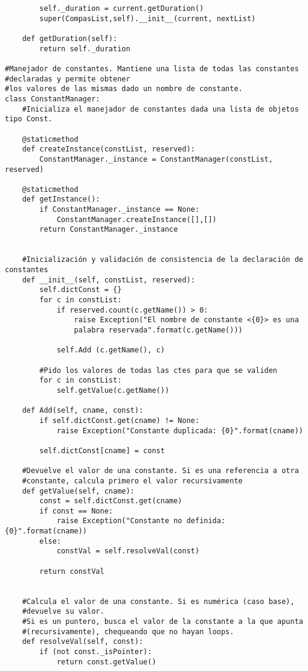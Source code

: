\begin{verbatim}
        self._duration = current.getDuration()
        super(CompasList,self).__init__(current, nextList)

    def getDuration(self):
        return self._duration

#Manejador de constantes. Mantiene una lista de todas las constantes 
#declaradas y permite obtener
#los valores de las mismas dado un nombre de constante.
class ConstantManager:
    #Inicializa el manejador de constantes dada una lista de objetos tipo Const.

    @staticmethod
    def createInstance(constList, reserved):
        ConstantManager._instance = ConstantManager(constList, reserved)

    @staticmethod
    def getInstance():
        if ConstantManager._instance == None:
            ConstantManager.createInstance([],[])
        return ConstantManager._instance


    #Inicialización y validación de consistencia de la declaración de constantes
    def __init__(self, constList, reserved):
        self.dictConst = {}
        for c in constList:
            if reserved.count(c.getName()) > 0:
                raise Exception("El nombre de constante <{0}> es una 
                palabra reservada".format(c.getName()))

            self.Add (c.getName(), c)

        #Pido los valores de todas las ctes para que se validen
        for c in constList:
            self.getValue(c.getName())

    def Add(self, cname, const):
        if self.dictConst.get(cname) != None:
            raise Exception("Constante duplicada: {0}".format(cname))

        self.dictConst[cname] = const

    #Devuelve el valor de una constante. Si es una referencia a otra 
    #constante, calcula primero el valor recursivamente
    def getValue(self, cname):
        const = self.dictConst.get(cname)
        if const == None:
            raise Exception("Constante no definida: {0}".format(cname))
        else:
            constVal = self.resolveVal(const)

        return constVal


    #Calcula el valor de una constante. Si es numérica (caso base), 
    #devuelve su valor.
    #Si es un puntero, busca el valor de la constante a la que apunta
    #(recursivamente), chequeando que no hayan loops.
    def resolveVal(self, const):
        if (not const._isPointer):
            return const.getValue()


\end{verbatim}
